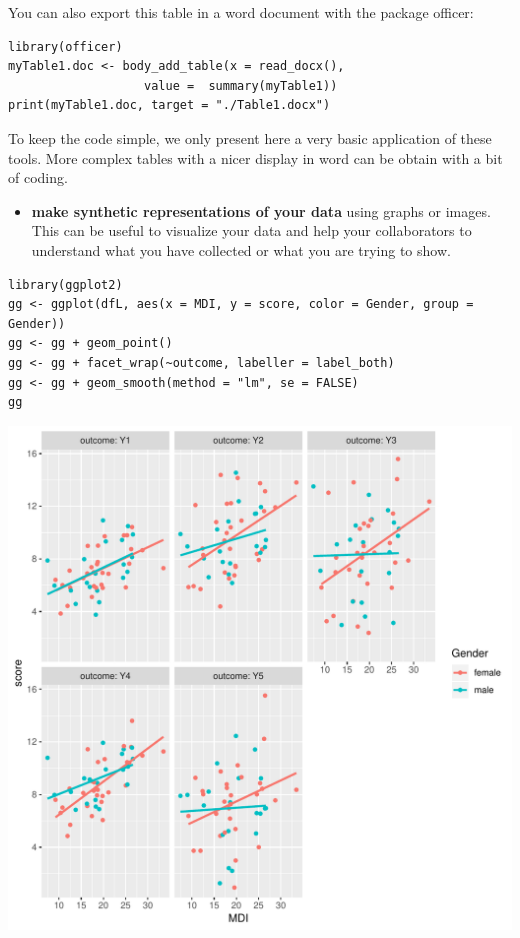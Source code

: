 \documentclass{article}
\begin{document}
You can also export this table in a word document with the package
officer:
\lstset{language=r,label= ,caption= ,captionpos=b,numbers=none}
\begin{lstlisting}
library(officer)
myTable1.doc <- body_add_table(x = read_docx(), 
			       value =  summary(myTable1)) 
print(myTable1.doc, target = "./Table1.docx")
\end{lstlisting}

To keep the code simple, we only present here a very basic application
of these tools. More complex tables with a nicer display in word can
be obtain with a bit of coding.

\begin{itemize}
\item \textbf{make synthetic representations of your data} using graphs or
images. This can be useful to visualize your data and help your
collaborators to understand what you have collected or what you are
trying to show.
\end{itemize}

\lstset{language=r,label= ,caption= ,captionpos=b,numbers=none}
\begin{lstlisting}
library(ggplot2)
gg <- ggplot(dfL, aes(x = MDI, y = score, color = Gender, group = Gender))
gg <- gg + geom_point()
gg <- gg + facet_wrap(~outcome, labeller = label_both)
gg <- gg + geom_smooth(method = "lm", se = FALSE)
gg
\end{lstlisting}

\begin{center}
\includegraphics[width=.9\linewidth]{./figures/descriptive.pdf}
\end{center}
\end{document}
